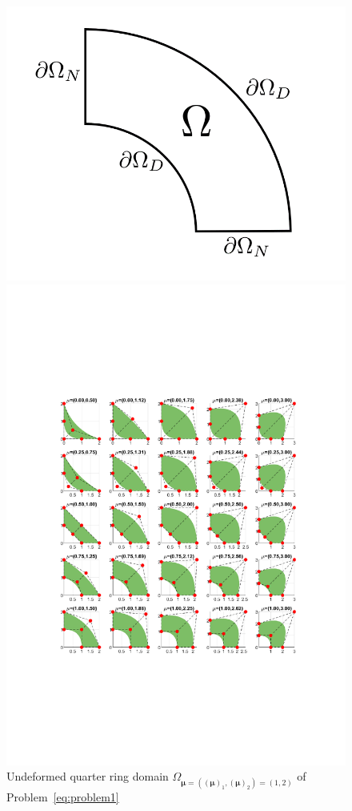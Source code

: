 \documentclass[11pt]{article}
\begin{document}
\begin{figure}[t]
\centering
\begin{minipage}{.4\textwidth}
    \includegraphics[width=\textwidth]{imgs/quarter-ring.png}
    \caption{Undeformed quarter ring domain $\Omega_{\boldsymbol \mu=((\boldsymbol \mu)_1, (\boldsymbol \mu)_2)=(1, 2)}$ of Problem~\ref{eq:problem1} }
    \label{fig:quarterring}
\end{minipage}%
\hfill
\begin{minipage}{.59\textwidth}
    \includegraphics[trim={3.3cm 6.5cm 3cm 7cm},clip,width=\textwidth]{imgs/quarter-ring-deform.pdf}

\end{minipage}
\end{figure}
\end{document}

